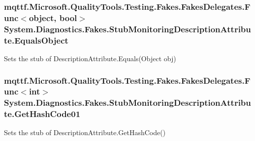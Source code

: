 \hypertarget{class_system_1_1_diagnostics_1_1_fakes_1_1_stub_monitoring_description_attribute_a7f20a38d7cc683c361f771885b0d238d}{
\subsubsection[{Equals\-Object}]{\setlength{\rightskip}{0pt plus 5cm}mqttf.\-Microsoft.\-Quality\-Tools.\-Testing.\-Fakes.\-Fakes\-Delegates.\-Func$<$object, bool$>$ System.\-Diagnostics.\-Fakes.\-Stub\-Monitoring\-Description\-Attribute.\-Equals\-Object}}\label{class_system_1_1_diagnostics_1_1_fakes_1_1_stub_monitoring_description_attribute_a7f20a38d7cc683c361f771885b0d238d}


Sets the stub of Description\-Attribute.\-Equals(\-Object obj)

\hypertarget{class_system_1_1_diagnostics_1_1_fakes_1_1_stub_monitoring_description_attribute_a243f86e7617f4e297438e06844409f35}{
\subsubsection[{Get\-Hash\-Code01}]{\setlength{\rightskip}{0pt plus 5cm}mqttf.\-Microsoft.\-Quality\-Tools.\-Testing.\-Fakes.\-Fakes\-Delegates.\-Func$<$int$>$ System.\-Diagnostics.\-Fakes.\-Stub\-Monitoring\-Description\-Attribute.\-Get\-Hash\-Code01}}\label{class_system_1_1_diagnostics_1_1_fakes_1_1_stub_monitoring_description_attribute_a243f86e7617f4e297438e06844409f35}


Sets the stub of Description\-Attribute.\-Get\-Hash\-Code()

